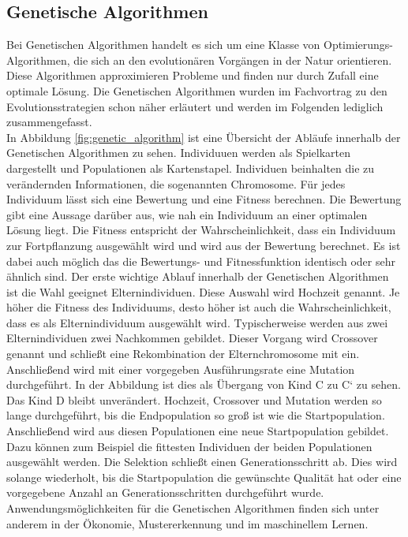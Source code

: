 \subsection{Genetische Algorithmen}
Bei Genetischen Algorithmen handelt es sich um eine Klasse von Optimierungs-Algorithmen, die sich an den evolutionären Vorgängen in der Natur orientieren. Diese Algorithmen approximieren Probleme und finden nur durch Zufall eine optimale Lösung.
Die Genetischen Algorithmen wurden im Fachvortrag zu den Evolutionsstrategien schon näher erläutert und werden im Folgenden lediglich zusammengefasst.\\
In Abbildung \ref{fig:genetic_algorithm} ist eine Übersicht der Abläufe innerhalb der Genetischen Algorithmen zu sehen. Individuuen werden als Spielkarten dargestellt und Populationen als Kartenstapel. Individuen beinhalten die zu verändernden Informationen, die sogenannten Chromosome.
Für jedes Individuum lässt sich eine Bewertung und eine Fitness berechnen. Die Bewertung gibt eine Aussage darüber aus, wie nah ein Individuum an einer optimalen Lösung liegt.
Die Fitness entspricht der Wahrscheinlichkeit, dass ein Individuum zur Fortpflanzung ausgewählt wird und wird aus der Bewertung berechnet. Es ist dabei auch möglich das die Bewertungs- und Fitnessfunktion identisch oder sehr ähnlich sind.
Der erste wichtige Ablauf innerhalb der Genetischen Algorithmen ist die Wahl geeignet Elternindividuen. Diese Auswahl wird Hochzeit genannt. Je höher die Fitness des Individuums, desto höher ist auch die Wahrscheinlichkeit, dass es als Elternindividuum ausgewählt wird.
Typischerweise werden aus zwei Elternindividuen zwei Nachkommen gebildet. Dieser Vorgang wird Crossover genannt und schließt eine Rekombination der Elternchromosome mit ein. Anschließend wird mit einer vorgegeben Ausführungsrate eine Mutation durchgeführt. In der Abbildung ist dies als Übergang von Kind C zu C` zu sehen. Das Kind D bleibt unverändert.
Hochzeit, Crossover und Mutation werden so lange durchgeführt, bis die Endpopulation so groß ist wie die Startpopulation. Anschließend wird aus diesen Populationen eine neue Startpopulation gebildet. Dazu können zum Beispiel die fittesten Individuen der beiden Populationen ausgewählt werden.
Die Selektion schließt einen Generationsschritt ab. Dies wird solange wiederholt, bis die Startpopulation die gewünschte Qualität hat oder eine vorgegebene Anzahl an Generationsschritten durchgeführt wurde.
Anwendungsmöglichkeiten für die Genetischen Algorithmen finden sich unter anderem in der Ökonomie, Mustererkennung und im maschinellem Lernen.

